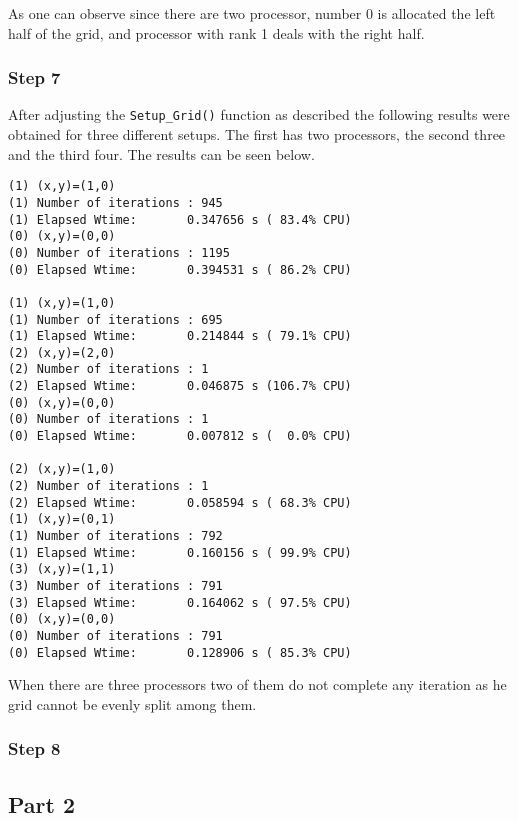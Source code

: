As one can observe since there are two processor, number 0 is allocated the left half of the grid, and processor with rank 1 deals with the right half.

\subsubsection{Step 7}
After adjusting the \texttt{Setup\_Grid()} function as described the following results were obtained for three different setups. The first has two processors, the second three and the third four. The results can be seen below.

\begin{lstlisting}
(1) (x,y)=(1,0)
(1)	Number of iterations : 945
(1) Elapsed Wtime:       0.347656 s ( 83.4% CPU)
(0) (x,y)=(0,0)
(0)	Number of iterations : 1195
(0) Elapsed Wtime:       0.394531 s ( 86.2% CPU)

(1) (x,y)=(1,0)
(1)	Number of iterations : 695
(1) Elapsed Wtime:       0.214844 s ( 79.1% CPU)
(2) (x,y)=(2,0)
(2)	Number of iterations : 1
(2) Elapsed Wtime:       0.046875 s (106.7% CPU)
(0) (x,y)=(0,0)
(0)	Number of iterations : 1
(0) Elapsed Wtime:       0.007812 s (  0.0% CPU)

(2) (x,y)=(1,0)
(2)	Number of iterations : 1
(2) Elapsed Wtime:       0.058594 s ( 68.3% CPU)
(1) (x,y)=(0,1)
(1)	Number of iterations : 792
(1) Elapsed Wtime:       0.160156 s ( 99.9% CPU)
(3) (x,y)=(1,1)
(3)	Number of iterations : 791
(3) Elapsed Wtime:       0.164062 s ( 97.5% CPU)
(0) (x,y)=(0,0)
(0)	Number of iterations : 791
(0) Elapsed Wtime:       0.128906 s ( 85.3% CPU)
\end{lstlisting}

When there are three processors two of them do not complete any iteration as he grid cannot be evenly split among them. %

\subsubsection{Step 8}


\subsection{Part 2}